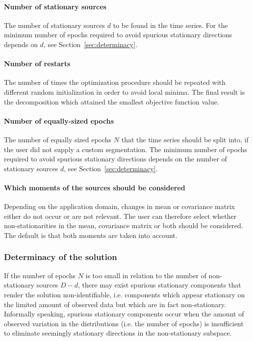 \documentclass{article}
\newcommand{\1}{\ensuremath{\mathds{1}}}
\newcommand{\0}{\ensuremath{0}}
\begin{document}
\paragraph{Number of stationary sources} The number of stationary sources $d$ to be 
found in the time series. For the minimum number of epochs required to avoid spurious
stationary directions depends on $d$, see Section~\ref{sec:determinacy}. 

\paragraph{Number of restarts} The number of times the optimization procedure
should be repeated with different random initialization in order to avoid local minima.
The final result is the decomposition which attained the smallest objective function
value.

\paragraph{Number of equally-sized epochs} The number of equally sized epochs $N$ that 
the time series should be split into, if the user did not supply a custom segmentation.
The minimum number of epochs required to avoid spurious
stationary directions depends on the number of stationary sources $d$, see Section~\ref{sec:determinacy}. 

\paragraph{Which moments of the sources should be considered} Depending on the application domain, 
changes in mean or covariance matrix either do not occur or are not relevant. The user can therefore 
select whether non-stationarities in the mean, covariance matrix or both should be considered. 
The default is that both moments are taken into account.

\subsubsection*{Determinacy of the solution}
\label{sec:determinacy}

If the number of epochs $N$ is too small in relation to the number of 
non-stationary sources $D-d$, there may exist spurious stationary components that render
the solution non-identifiable, i.e. components which appear stationary on the
limited amount of observed data but which are in fact non-stationary.
Informally speaking, spurious stationary components occur when the amount of 
observed variation in the distributions (i.e. the number of epochs) is insufficient 
to eliminate seemingly stationary directions in the non-stationary subspace. 
\end{document}
